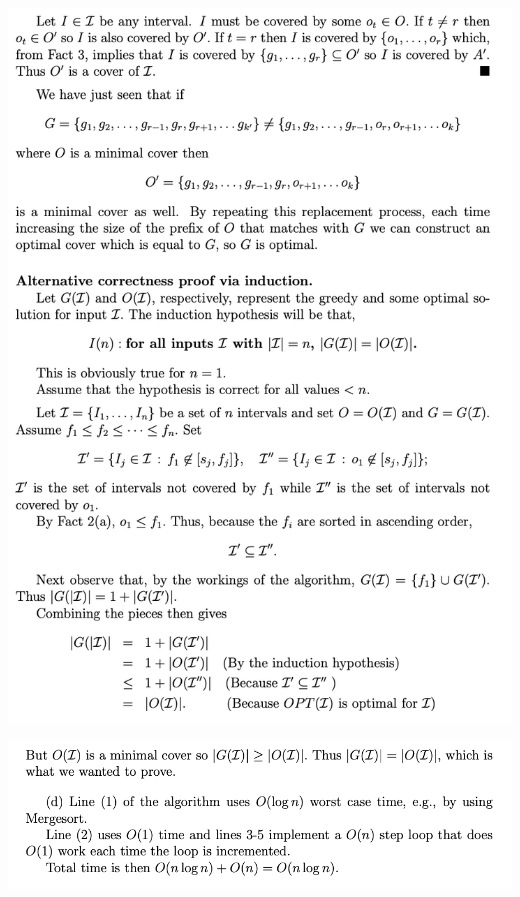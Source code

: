 \begin{spacing}{1.3}
    \newpage
    \includegraphics[scale=1.05]{images/07-exercise-2021f-hw-sol4}

    \newpage
    \includegraphics[scale=1.00]{images/07-exercise-2021f-hw-sol5}

\end{spacing}